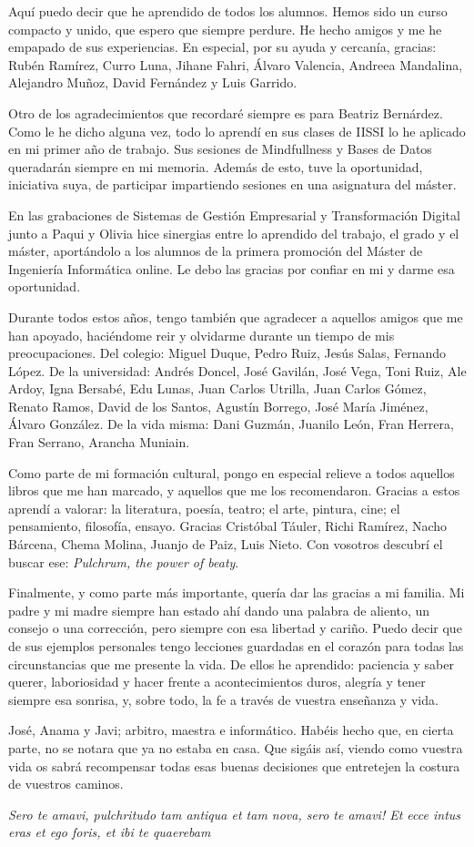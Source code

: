 Aquí puedo decir que he aprendido de todos los alumnos. Hemos sido un curso compacto y unido, que espero que siempre perdure. He hecho amigos y me he empapado de sus experiencias. En especial, por su ayuda y cercanía, gracias: Rubén Ramírez, Curro Luna, Jihane Fahri, Álvaro Valencia, Andreea Mandalina, Alejandro Muñoz, David Fernández y Luis Garrido.

Otro de los agradecimientos que recordaré siempre es para Beatriz Bernárdez. Como le he dicho alguna vez, todo lo aprendí en sus clases de IISSI lo he aplicado en mi primer año de trabajo. Sus sesiones de Mindfullness y Bases de Datos queradarán siempre en mi memoria. Además de esto, tuve la oportunidad, iniciativa suya, de participar impartiendo sesiones en una asignatura del máster.

En las grabaciones de Sistemas de Gestión Empresarial y Transformación Digital junto a Paqui y Olivia hice sinergias entre lo aprendido del trabajo, el grado y el máster, aportándolo a los alumnos de la primera promoción del Máster de Ingeniería Informática online. Le debo las gracias por confiar en mi y darme esa oportunidad.

Durante todos estos años, tengo también que agradecer a aquellos amigos que me han apoyado, haciéndome reir y olvidarme durante un tiempo de mis preocupaciones. Del colegio: Miguel Duque, Pedro Ruiz, Jesús Salas, Fernando López. De la universidad: Andrés Doncel, José Gavilán, José Vega, Toni Ruiz, Ale Ardoy, Igna Bersabé, Edu Lunas, Juan Carlos Utrilla, Juan Carlos Gómez, Renato Ramos, David de los Santos, Agustín Borrego, José María Jiménez, Álvaro González. De la vida misma: Dani Guzmán, Juanilo León, Fran Herrera, Fran Serrano, Arancha Muniain.

Como parte de mi formación cultural, pongo en especial relieve a todos aquellos libros que me han marcado, y aquellos que me los recomendaron. Gracias a estos aprendí a valorar: la literatura, poesía, teatro; el arte, pintura, cine; el pensamiento, filosofía, ensayo. Gracias Cristóbal Táuler, Richi Ramírez, Nacho Bárcena, Chema Molina, Juanjo de Paiz, Luis Nieto. Con vosotros descubrí el buscar ese: \textit{Pulchrum, the power of beaty}.

Finalmente, y como parte más importante, quería dar las gracias a mi familia. Mi padre y mi madre siempre han estado ahí dando una palabra de aliento, un consejo o una corrección, pero siempre con esa libertad y cariño. Puedo decir que de sus ejemplos personales tengo lecciones guardadas en el corazón para todas las circunstancias que me presente la vida. De ellos he aprendido: paciencia y saber querer, laboriosidad y hacer frente a acontecimientos duros, alegría y tener siempre esa sonrisa, y, sobre todo, la fe a través de vuestra enseñanza y vida.

José, Anama y Javi; arbitro, maestra e informático. Habéis hecho que, en cierta parte, no se notara que ya no estaba en casa. Que sigáis así, viendo como vuestra vida os sabrá recompensar todas esas buenas decisiones que entretejen la costura de vuestros caminos.

\hfill \break
\hfill \textit{Sero te amavi, pulchritudo tam antiqua et tam nova, sero te amavi! Et ecce intus eras et ego foris, et ibi te quaerebam}
